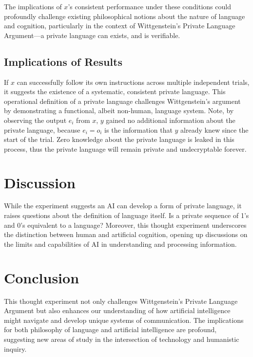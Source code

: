 \documentclass[12pt]{article}
\begin{document}
The implications of \( x \)'s consistent performance under these conditions could profoundly challenge existing philosophical notions about the nature of language and cognition, particularly in the context of Wittgenstein's Private Language Argument---a private language can exists, and is verifiable. 


\subsection{Implications of Results}
If \( x \) can successfully follow its own instructions across multiple independent trials, it suggests the existence of a systematic, consistent private language. This operational definition of a private language challenges Wittgenstein's argument by demonstrating a functional, albeit non-human, language system. Note, by observing the output $e_i$ from $x$, $y$ gained no additional information about the private language, because $e_i=o_i$ is the information that $y$ already knew since the start of the trial. Zero knowledge about the private language is leaked in this process, thus the private language will remain private and undecryptable forever. 

\section{Discussion}
While the experiment suggests an AI can develop a form of private language, it raises questions about the definition of language itself. Is a private sequence of 1's and 0's equivalent to a language? Moreover, this thought experiment underscores the distinction between human and artificial cognition, opening up discussions on the limits and capabilities of AI in understanding and processing information.

\section{Conclusion}
This thought experiment not only challenges Wittgenstein's Private Language Argument but also enhances our understanding of how artificial intelligence might navigate and develop unique systems of communication. The implications for both philosophy of language and artificial intelligence are profound, suggesting new areas of study in the intersection of technology and humanistic inquiry.
\end{document}
